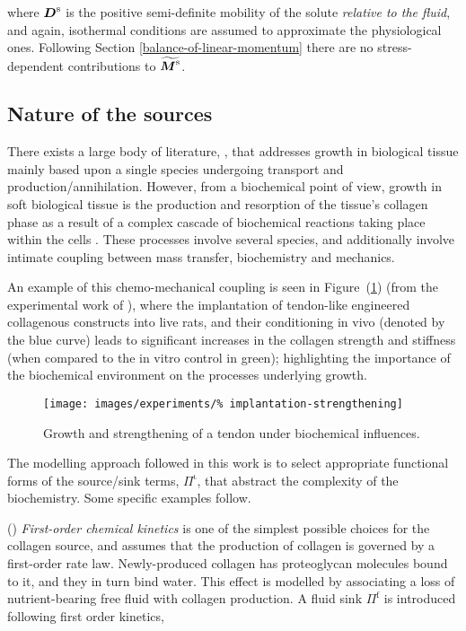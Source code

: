 \noindent where $\mbox{\boldmath$ D$}^\mathrm{s}$ is the positive semi-definite
mobility of the solute {\em relative to the fluid}, and again,
isothermal conditions are assumed to approximate the physiological
ones. Following Section \ref{balance-of-linear-momentum} there are no
stress-dependent contributions to $\widetilde{\mbox{\boldmath$ M$}^\mathrm{s}}$.

\subsection{Nature of the sources}
\label{nature-of-sources}

There exists a large body of literature, \citep{CowinHegedus:76,
  EpsteinMaugin:2000, AmbrosiMollica:2002}, that addresses growth in
biological tissue mainly based upon a single species undergoing
transport and production/annihilation. However, from a biochemical
point of view, growth in soft biological tissue is the production and
resorption of the tissue's collagen phase as a result of a complex
cascade of biochemical reactions taking place within the cells
\citep{Alberts:02}. These processes involve several species, and
additionally involve intimate coupling between mass transfer,
biochemistry and mechanics.

An example of this chemo-mechanical coupling is seen in
Figure~(\ref{implantation-strengthening}) (from the experimental work
of \citet{calveetal:07}), where the implantation of tendon-like
engineered collagenous constructs into live rats, and their
conditioning in vivo (denoted by the blue curve) leads to significant
increases in the collagen strength and stiffness (when compared to the
in vitro control in green); highlighting the importance of the
biochemical environment on the processes underlying growth.

\begin{figure}
  \centering
  \texttt{[image: images/experiments/\%
    implantation-strengthening]}
  \caption{Growth and strengthening of a tendon under biochemical
    influences.}
  \label{implantation-strengthening}
\end{figure}

The modelling approach followed in this work is to select appropriate
functional forms of the source/sink terms, $\Pi^{\mathrm{\iota}}$,
that abstract the complexity of the biochemistry. Some specific
examples follow.

() {\em First-order chemical kinetics} is one of the
simplest possible choices for the collagen source, and assumes that
the production of collagen is governed by a first-order rate
law. Newly-produced collagen has proteoglycan molecules bound to it,
and they in turn bind water. This effect is modelled by associating a
loss of nutrient-bearing free fluid with collagen production. A fluid
sink $\Pi^\mathrm{f}$ is introduced following first order kinetics,

